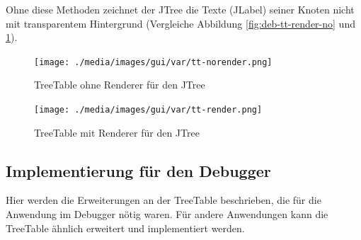 Ohne diese Methoden zeichnet der JTree die Texte (JLabel) seiner Knoten nicht mit transparentem Hintergrund (Vergleiche Abbildung \ref{fig:deb-tt-render-no} und \ref{fig:deb-tt-render-yes}).

\begin{figure}[h!]
\centering
	\begin{minipage}{0.45\textwidth}
		\centering
		\texttt{[image: ./media/images/gui/var/tt-norender.png]}
		\caption{TreeTable ohne Renderer für den JTree}\label{fig:deb-tt-render-no}
	\end{minipage}\hfill
	\begin{minipage}{0.48\textwidth}
		\centering
		\texttt{[image: ./media/images/gui/var/tt-render.png]}
		\caption{TreeTable mit Renderer für den JTree}\label{fig:deb-tt-render-yes}
	\end{minipage}
\end{figure}

\subsection{Implementierung für den Debugger}
\label{sec:deb-var-special}
Hier werden die Erweiterungen an der TreeTable beschrieben, die für die Anwendung im Debugger nötig waren. Für andere Anwendungen kann die TreeTable ähnlich erweitert und implementiert werden.

